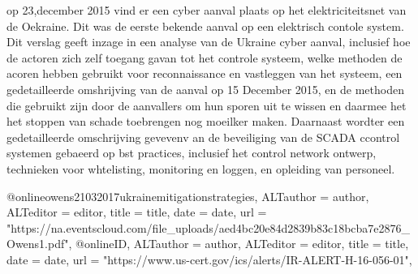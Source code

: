 {{{{{{{{{{{{{{op 23,december 2015  vind er een cyber aanval plaats op het elektriciteitsnet van de Oekraine. Dit was de eerste bekende aanval op een elektrisch contole  system.  Dit verslag geeft inzage in een analyse van de Ukraine cyber aanval,
inclusief hoe de actoren zich zelf toegang gavan tot het controle systeem, welke methoden de acoren hebben gebruikt voor reconnaissance en vastleggen van het systeem, een gedetailleerde omshrijving van de aanval op 15 December 2015, en de methoden die gebruikt zijn door de aanvallers om hun sporen uit te wissen en daarmee het het stoppen van schade toebrengen  nog moeilker maken. Daarnaast wordter  een gedetailleerde omschrijving gevevenv an de beveiliging van de SCADA ccontrol systemen gebaeerd op bst practices, inclusief het control network ontwerp, technieken voor whtelisting, monitoring en loggen, en  opleiding van personeel.
\cite{Whitehead2017ukrainepoweroutage}

\cite{noauthor_2022-nm}
\cite{zetter2016GridHack}


@online{owens21032017ukrainemitigationstrategies,	ALTauthor = {author},	ALTeditor = {editor},	title = {title},	date = {date},	url = {"https://na.eventscloud.com/file_uploads/aed4bc20e84d2839b83c18bcba7e2876_Owens1.pdf"},}
@online{ID,	ALTauthor = {author},	ALTeditor = {editor},	title = {title},	date = {date},	url = {"https://www.us-cert.gov/ics/alerts/IR-ALERT-H-16-056-01"},}

}}}}}}}}}}}}}}
